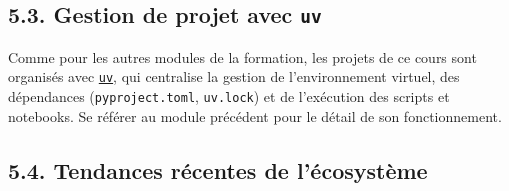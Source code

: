 \documentclass[
  french,
  letterpaper,
  open=any]{scrbook}
\theoremstyle{definition}
\theoremstyle{definition}
\theoremstyle{remark}
\begin{document}
\subsection{\texorpdfstring{5.3. Gestion de projet avec
\texttt{uv}}{5.3. Gestion de projet avec uv}}\label{gestion-de-projet-avec-uv}

Comme pour les autres modules de la formation, les projets de ce cours
sont organisés avec \href{https://docs.astral.sh/uv/}{\texttt{uv}}, qui
centralise la gestion de l'environnement virtuel, des dépendances
(\texttt{pyproject.toml}, \texttt{uv.lock}) et de l'exécution des
scripts et notebooks. Se référer au module précédent pour le détail de
son fonctionnement.

\subsection{5.4. Tendances récentes de
l'écosystème}\label{tendances-ruxe9centes-de-luxe9cosystuxe8me}
\end{document}
